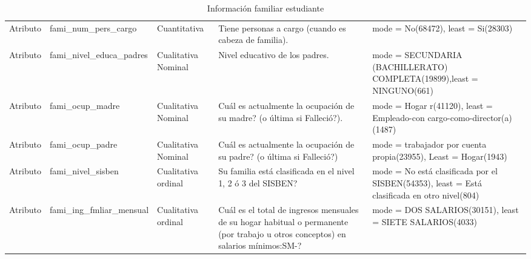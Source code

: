\begin{table*}[ht]
\caption{Información familiar estudiante}
\label{table:fami}
\begin{tabular}{|>{\centering\arraybackslash}m{2cm}|>{\arraybackslash}m{4cm}|>{\arraybackslash}m{2cm}|>{\arraybackslash}m{3cm}|>{\arraybackslash}m{4cm}| }
\hline
  \rowcolor{blue!55} 
   \multicolumn{1}{|c|}{Atributo} & \multicolumn{1}{c|}{Nombre} & \multicolumn{1}{c|}{Tipo} & 
   \multicolumn{1}{c|}{Descripción} & \multicolumn{1}{c|}{Estadística} \\ \hline
    Atributo & fami\_num\_pers\_cargo & Cuantitativa & Tiene personas a cargo (cuando es cabeza de familia). & mode = No(68472), least = Si(28303) \\ \hline
    Atributo & fami\_nivel\_educa\_padres & Cualitativa Nominal & Nivel educativo de los padres. & mode = SECUNDARIA (BACHILLERATO) COMPLETA(19899),least = NINGUNO(661) \\ \hline
    Atributo & fami\_ocup\_madre & Cualitativa Nominal & Cuál es actualmente la ocupación de su madre? (o última si Falleció?). & mode = Hogar r(41120), least = Empleado-con cargo-como-director(a)(1487) \\ \hline
    Atributo & fami\_ocup\_padre & Cualitativa Nominal & Cuál es actualmente la ocupación de su padre? (o última si Falleció?) & mode = trabajador por cuenta propia(23955), Least = Hogar(1943) \\ \hline
    Atributo & fami\_nivel\_sisben & Cualitativa ordinal & Su familia está clasificada en el nivel 1, 2 ó 3 del SISBEN? & mode = No está clasificada por el SISBEN(54353), least = Está clasificada en otro nivel(804)\\ \hline
    Atributo & fami\_ing\_fmliar\_mensual & Cualitativa ordinal & Cuál es el total de ingresos mensuales de su hogar habitual o permanente (por trabajo u otros conceptos) en salarios mínimos:SM-? & mode = DOS SALARIOS(30151), least = SIETE SALARIOS(4033) \\ \hline
    \end{tabular}
\end{table*}


